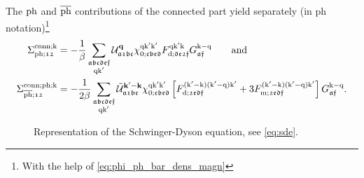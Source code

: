 \documentclass[../../main.tex]{subfiles}
\begin{document}
The $\text{ph}$ and $\overline{\text{ph}}$ contributions of the connected part yield separately (in ph notation)\footnote{With the help of \eqref{eq:phi_ph_bar_dens_magn}} \cite{Galler2017}
\begin{subequations}
\begin{align}
	\Sigma^{\text{conn};\text{k}}_{\text{ph};\mathfrak{12}}&=-\frac1\beta\sum_{\substack{\mathfrak{abcdef}\\\text{q}\text{k}'}}\mathcal{U}^{\textbf{q}}_{\mathfrak{a1bc}}\chi^{\text{q}\text{k}'\text{k}'}_{0;\mathfrak{cbed}}F^{\text{q}\text{k}'\text{k}}_{\text{d};\mathfrak{de2f}}G_{\mathfrak{af}}^{\text{k}-\text{q}}\qquad\text{and}\\
	\Sigma^{\text{conn};\text{ph};\text{k}}_{\overline{\text{ph}};\mathfrak{12}}&=-\frac{1}{2\beta}\sum_{\substack{\mathfrak{abcdef}\\\text{q}\text{k}'}}\tilde{\mathcal{U}}^{\textbf{k}'-\textbf{k}}_{\mathfrak{a1bc}}\chi^{\text{q}\text{k}'\text{k}'}_{0;\mathfrak{cbed}}\left [F^{(\text{k}'-\text{k})(\text{k}'-\text{q})\text{k}'}_{\text{d};\mathfrak{2edf}}+3 F^{(\text{k}'-\text{k})(\text{k}'-\text{q})\text{k}'}_{\text{m};\mathfrak{2edf}}\right ]G_{\mathfrak{af}}^{\text{k}-\text{q}}.
\end{align}
\end{subequations}
\begin{figure}[ht!]
	\centering
  	
  	\caption{Representation of the Schwinger-Dyson equation, see \eqref{eq:sde}.}
  	\label{fig:sde}
\end{figure}
\end{document}
